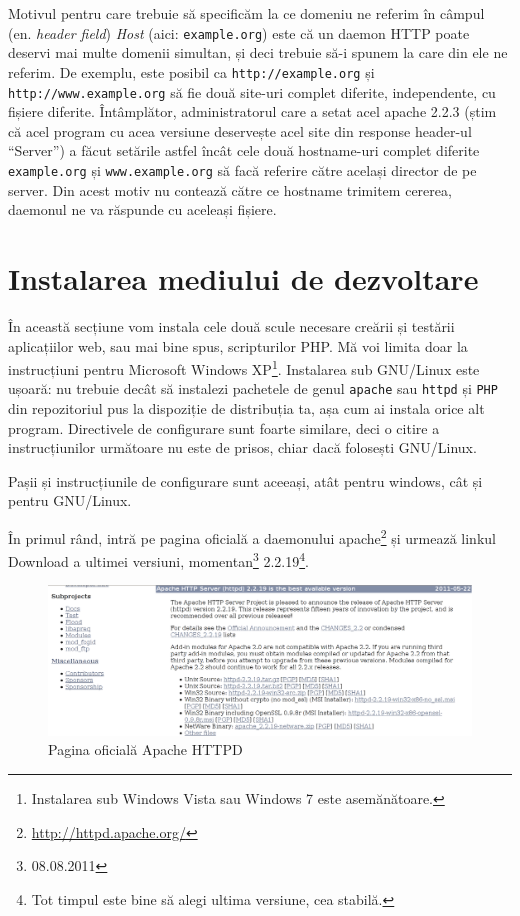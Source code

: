Motivul pentru care trebuie să specificăm la ce domeniu ne referim în câmpul
(en. \textsl{header field}) \textsl{Host} (aici: \texttt{example.org}) este că un daemon HTTP
poate deservi mai multe domenii simultan, și deci trebuie să-i spunem la care
din ele ne referim.
De exemplu, este posibil ca \texttt{http://example.org} și
\texttt{http://www.example.org} să fie două site-uri complet diferite, independente, cu
fișiere diferite. Întâmplător, administratorul care a setat acel apache 2.2.3 (știm că
acel program cu acea versiune deservește acel site din response header-ul ``Server'') a făcut setările astfel
încât cele două hostname-uri complet diferite \texttt{example.org} și \texttt{www.example.org}
să facă referire către același director de pe server. Din acest motiv nu contează
către ce hostname trimitem cererea, daemonul ne va răspunde cu aceleași fișiere.

\section{Instalarea mediului de dezvoltare}
În această secțiune vom instala cele două scule necesare creării și testării
aplicațiilor web, sau mai bine spus, scripturilor PHP. Mă voi limita doar
la instrucțiuni pentru Microsoft Windows XP\footnote{Instalarea sub Windows Vista sau 
Windows 7 este asemănătoare.}. Instalarea sub GNU/Linux este ușoară: nu trebuie
decât să instalezi pachetele de genul \texttt{apache} sau \texttt{httpd}
și \texttt{PHP} din repozitoriul
pus la dispoziție de distribuția ta, așa cum ai instala orice alt program.
Directivele de configurare sunt foarte similare, deci o citire a instrucțiunilor
următoare nu este de prisos, chiar dacă folosești GNU/Linux.

Pașii și instrucțiunile de configurare sunt aceeași,
atât pentru windows, cât și pentru GNU/Linux.

În primul rând, intră pe pagina oficială a daemonului
apache\footnote{\url{http://httpd.apache.org/}} și urmează linkul
Download a ultimei versiuni, momentan\footnote{08.08.2011} 2.2.19\footnote{Tot
timpul este bine să alegi ultima versiune, cea stabilă.}.


\begin{figure}[ht!]
  \centering
    \includegraphics[width=400bp]{cap01/Screenshot.png}
  \caption{Pagina oficială Apache HTTPD}
  \label{fig:httpd homepage}
\end{figure}


